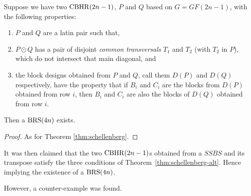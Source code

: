 \begin{theorem}
Suppose we have two $\operatorname{CBHR}(2n - 1)$, $P$ and $Q$ based on $G = GF(2n - 1)$, with the following properties:
\begin{enumerate}
  \item{$P$ and $Q$ are a latin pair such that,}
  \item{$P \odot Q$ has a pair of disjoint
    \emph{common transversals} $T_1$ and $T_2$
    (with $T_2$ in $P$), which do not intersect that main
    diagonal, and}
  \item{the block designs obtained from $P$ and $Q$, call
    them $D(P)$ and $D(Q)$ respectively, have the property
    that if $B_i$ and $C_i$ are the blocks from $D(P)$
    obtained from row $i$, then $B_i$ and $C_i$
    are also the blocks of $D(Q)$ obtained from row $i$.}
\end{enumerate}

Then a $\operatorname{BRS}(4n)$ exists.
\label{thm:schellenberg-alt}
\end{theorem}

\begin{proof}
As for Theorem \ref{thm:schellenberg}.
\end{proof}

It was then claimed that the two $\operatorname{CBHR}(2n - 1)$s obtained from a $SSBS$ and its transpose satisfy the three conditions of Theorem~\ref{thm:schellenberg-alt}.
Hence implying the existence of a $\operatorname{BRS}(4n)$.

However, a counter-example was found.

